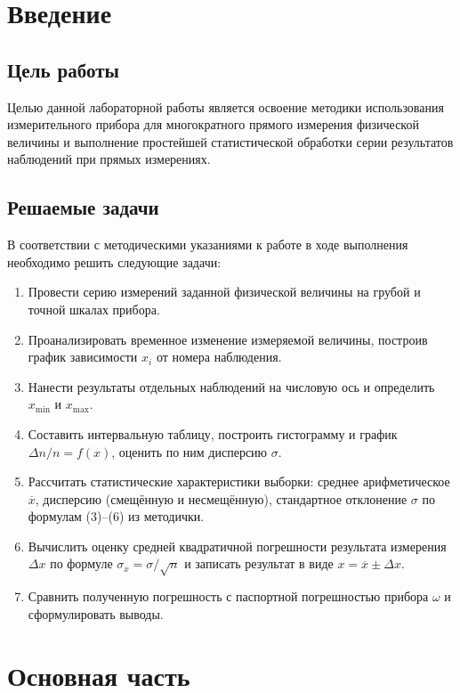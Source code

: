 \section{Введение}



\subsection{Цель работы}

Целью данной лабораторной работы является освоение методики использования измерительного прибора для 
многократного прямого измерения физической величины и выполнение простейшей статистической обработки серии 
результатов наблюдений при прямых измерениях.

\subsection{Решаемые задачи}
В соответствии с методическими указаниями к работе в ходе выполнения необходимо решить следующие задачи:
\begin{enumerate}
    \item Провести серию измерений заданной физической величины на грубой и точной шкалах прибора.
    \item Проанализировать временное изменение измеряемой величины, построив график зависимости \(x_i\) от номера наблюдения.
    \item Нанести результаты отдельных наблюдений на числовую ось и определить \(x_{\min}\) и \(x_{\max}\).
    \item Составить интервальную таблицу, построить гистограмму и график \(\Delta n / n = f(x)\), оценить по ним дисперсию \(\sigma\).
    \item Рассчитать статистические характеристики выборки: среднее арифметическое \(\overline{x}\), дисперсию (смещённую и несмещённую), стандартное отклонение \(\sigma\) по формулам (3)–(6) из методички.
    \item Вычислить оценку средней квадратичной погрешности результата измерения \(\Delta x\) по формуле \(\sigma_{\overline{x}} = \sigma / \sqrt{n}\) и записать результат в виде \(x = \overline{x} \pm \Delta x\).
    \item Сравнить полученную погрешность с паспортной погрешностью прибора \(\omega\) и сформулировать выводы.
\end{enumerate}
\section{Основная часть}

